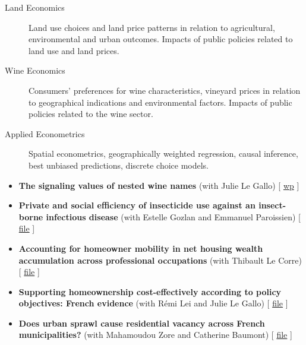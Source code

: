 \documentclass[11pt, a4paper]{./style}
\begin{document}
\label{sec:org54db032}

\begin{description}
\item[{Land Economics}] Land use choices and land price patterns in
relation to agricultural, environmental and urban
outcomes. Impacts of public policies related to land use and land
prices.
\item[{Wine Economics}] Consumers' preferences for wine characteristics,
vineyard prices in relation to geographical indications and
environmental factors. Impacts of public policies related to the
wine sector.
\item[{Applied Econometrics}] Spatial econometrics, geographically
weighted regression, causal inference, best unbiased predictions,
discrete choice models.
\end{description}

\label{sec:orgcd99f83}

\begin{itemize}
\item \textbf{The signaling values of nested wine names} (with Julie Le
Gallo) [ \href{https://wine-economics.org/wp-content/uploads/2021/05/AAWE\_WP265.pdf}{wp} ]
\item \textbf{Private and social efficiency of insecticide use against an
insect-borne infectious disease} (with Estelle Gozlan and
Emmanuel Paroissien) [ \href{doc/RISCA-FILE.pdf}{file} ]
\item \textbf{Accounting for homeowner mobility in net housing wealth
accumulation across professional occupations} (with Thibault Le
Corre) [ \href{doc/PPL-FILE.pdf}{file} ]
\item \textbf{Supporting homeownership cost-effectively according to policy
objectives: French evidence} (with Rémi Lei and Julie Le Gallo) [
\href{doc/CEREM-FILE.pdf}{file} ]
\item \textbf{Does urban sprawl cause residential vacancy across French
municipalities?} (with Mahamoudou Zore and Catherine Baumont) [
\href{doc/ZORE-FILE.pdf}{file} ]
\end{itemize}

\label{sec:orgb379dfa}
\label{sec:org165d65b}
\end{document}
